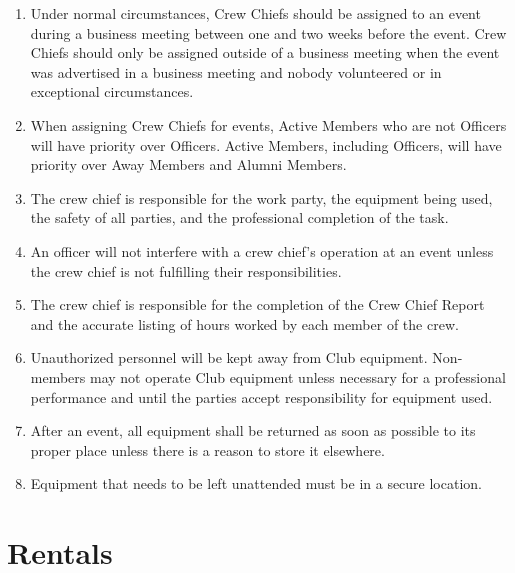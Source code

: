 \documentclass[12pt,letterpaper,oneside]{book}
\begin{document}
\begin{enumerate}

\item Under normal circumstances, Crew Chiefs should be assigned to an event during a business meeting between one and two weeks before the event. Crew Chiefs should only be assigned outside of a business meeting when the event was advertised in a business meeting and nobody volunteered or in exceptional circumstances.
\item When assigning Crew Chiefs for events, Active Members who are not Officers will have priority over Officers. Active Members, including Officers, will have priority over Away Members and Alumni Members.
\item The crew chief is responsible for the work party, the equipment being used, the safety of all parties, and the professional completion of the task.
\item An officer will not interfere with a crew chief's operation at an event
    unless the crew chief is not fulfilling their responsibilities.
\item The crew chief is responsible for the completion of the Crew Chief Report and the accurate listing of hours worked by each member of the crew.
\item Unauthorized personnel will be kept away from Club equipment. Non-members may not operate Club equipment unless necessary for a professional performance and until the parties accept responsibility for equipment used.
\item After an event, all equipment shall be returned as soon as possible to its proper place unless there is a reason to store it elsewhere.
\item Equipment that needs to be left unattended must be in a secure location. 

\end{enumerate}

\section{Rentals}
\end{document}
